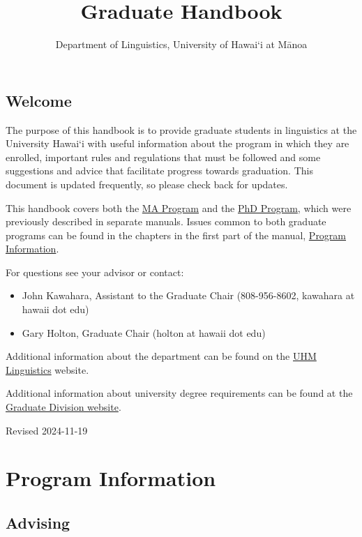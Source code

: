 \documentclass[
]{book}
\title{Graduate Handbook}
\author{Department of Linguistics, University of Hawai`i at Mānoa}
\date{}
\providecommand{\tightlist}{%
  \setlength{\itemsep}{0pt}\setlength{\parskip}{0pt}}
\begin{document}
\maketitle

{
\setcounter{tocdepth}{1}
\tableofcontents
}
\chapter*{Welcome}\label{welcome}

The purpose of this handbook is to provide graduate students in linguistics at the University Hawai`i with useful information about the program in which they are enrolled, important rules and regulations that must be followed and some suggestions and advice that facilitate progress towards graduation. This document is updated frequently, so please check back for updates.

This handbook covers both the \hyperref[maprogram]{MA Program} and the \hyperref[phdprogram]{PhD Program}, which were previously described in separate manuals. Issues common to both graduate programs can be found in the chapters in the first part of the manual, \hyperref[general]{Program Information}.

For questions see your advisor or contact:

\begin{itemize}
\tightlist
\item
  John Kawahara, Assistant to the Graduate Chair (808-956-8602, kawahara at hawaii dot edu)
\item
  Gary Holton, Graduate Chair (holton at hawaii dot edu)
\end{itemize}

Additional information about the department can be found on the \href{http://manoa.hawaii.edu/linguistics/}{UHM Linguistics} website.

Additional information about university degree requirements can be found at the \href{https://manoa.hawaii.edu/graduate/current-students/}{Graduate Division website}.

{Revised 2024-11-19}

\part*{Program Information}\label{part-program-information}

\chapter{Advising}\label{general}
\end{document}
